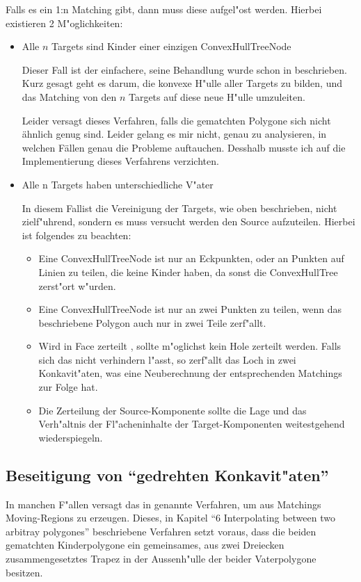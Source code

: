 Falls es ein 1:n Matching gibt, dann muss diese aufgel"ost werden. Hierbei existieren 2 M"oglichkeiten:
\begin{itemize}
\item Alle $n$ Targets sind Kinder einer einzigen ConvexHullTreeNode

Dieser Fall ist der einfachere, seine Behandlung wurde schon in \cite{TG} beschrieben. Kurz gesagt geht es darum, die konvexe H"ulle aller Targets zu bilden, und das Matching von den $n$ Targets auf diese neue H"ulle umzuleiten.

Leider versagt dieses Verfahren, falls die gematchten Polygone sich nicht ähnlich genug sind. Leider gelang es mir nicht, genau zu analysieren, in welchen Fällen genau die Probleme auftauchen. Desshalb musste ich auf die Implementierung dieses Verfahrens verzichten.

\item Alle n Targets haben unterschiedliche V"ater

In diesem Fallist die Vereinigung der Targets, wie oben beschrieben, nicht zielf"uhrend, sondern es muss versucht werden den Source aufzuteilen. Hierbei ist folgendes zu beachten:
\begin{itemize}
\item Eine ConvexHullTreeNode ist nur an Eckpunkten, oder an Punkten auf Linien zu teilen, die keine Kinder haben, da sonst die ConvexHullTree zerst"ort w"urden.

\item Eine ConvexHullTreeNode ist nur an zwei Punkten zu teilen, wenn das beschriebene Polygon auch nur in zwei Teile zerf"allt.
\item Wird in Face zerteilt , sollte m"oglichst kein Hole zerteilt werden. Falls sich das nicht verhindern l"asst, so zerf"allt das Loch in zwei Konkavit"aten, was eine Neuberechnung der entsprechenden Matchings zur Folge hat.

\item Die Zerteilung der Source-Komponente sollte die Lage und das Verh"altnis der Fl"acheninhalte der Target-Komponenten weitestgehend wiederspiegeln.

\end{itemize} 
\end{itemize} 
\subsection{Beseitigung von "`gedrehten Konkavit"aten"'}\label{gedrehtKon}
In manchen F"allen versagt das in \cite{TG} genannte Verfahren, um aus Matchings Moving-Regions zu erzeugen. Dieses, in Kapitel "`6 Interpolating between two arbitray polygones"' beschriebene Verfahren setzt voraus, dass die beiden gematchten Kinderpolygone ein gemeinsames, aus zwei Dreiecken zusammengesetztes Trapez in der Aussenh"ulle der beider Vaterpolygone besitzen. 

